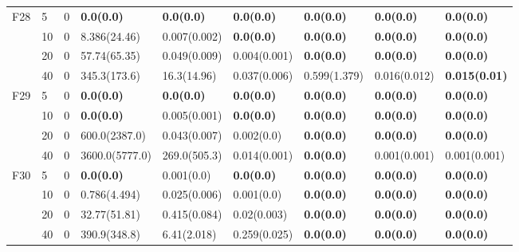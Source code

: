 \begin{longtable}{|l|l|l|l|l|l|l|l|l|}
F28            & 5   & 0        & \textbf{0.0(0.0)}             & \textbf{0.0(0.0)}           & \textbf{0.0(0.0)}       & \textbf{0.0(0.0)}         & \textbf{0.0(0.0)}      & \textbf{0.0(0.0)}     \\
\cmidrule{2-9} & 10  & 0        & 8.386(24.46)                  & 0.007(0.002)                & \textbf{0.0(0.0)}       & \textbf{0.0(0.0)}         & \textbf{0.0(0.0)}      & \textbf{0.0(0.0)}     \\
\cmidrule{2-9} & 20  & 0        & 57.74(65.35)                  & 0.049(0.009)                & 0.004(0.001)            & \textbf{0.0(0.0)}         & \textbf{0.0(0.0)}      & \textbf{0.0(0.0)}     \\
\cmidrule{2-9} & 40  & 0        & 345.3(173.6)                  & 16.3(14.96)                 & 0.037(0.006)            & 0.599(1.379)              & 0.016(0.012)           & \textbf{0.015(0.01)}  \\ \hline
F29            & 5   & 0        & \textbf{0.0(0.0)}             & \textbf{0.0(0.0)}           & \textbf{0.0(0.0)}       & \textbf{0.0(0.0)}         & \textbf{0.0(0.0)}      & \textbf{0.0(0.0)}     \\
\cmidrule{2-9} & 10  & 0        & \textbf{0.0(0.0)}             & 0.005(0.001)                & \textbf{0.0(0.0)}       & \textbf{0.0(0.0)}         & \textbf{0.0(0.0)}      & \textbf{0.0(0.0)}     \\
\cmidrule{2-9} & 20  & 0        & 600.0(2387.0)                 & 0.043(0.007)                & 0.002(0.0)              & \textbf{0.0(0.0)}         & \textbf{0.0(0.0)}      & \textbf{0.0(0.0)}     \\
\cmidrule{2-9} & 40  & 0        & 3600.0(5777.0)                & 269.0(505.3)                & 0.014(0.001)            & \textbf{0.0(0.0)}         & 0.001(0.001)           & 0.001(0.001)          \\ \hline
F30            & 5   & 0        & \textbf{0.0(0.0)}             & 0.001(0.0)                  & \textbf{0.0(0.0)}       & \textbf{0.0(0.0)}         & \textbf{0.0(0.0)}      & \textbf{0.0(0.0)}     \\
\cmidrule{2-9} & 10  & 0        & 0.786(4.494)                  & 0.025(0.006)                & 0.001(0.0)              & \textbf{0.0(0.0)}         & \textbf{0.0(0.0)}      & \textbf{0.0(0.0)}     \\
\cmidrule{2-9} & 20  & 0        & 32.77(51.81)                  & 0.415(0.084)                & 0.02(0.003)             & \textbf{0.0(0.0)}         & \textbf{0.0(0.0)}      & \textbf{0.0(0.0)}     \\
\cmidrule{2-9} & 40  & 0        & 390.9(348.8)                  & 6.41(2.018)                 & 0.259(0.025)            & \textbf{0.0(0.0)}         & \textbf{0.0(0.0)}      & \textbf{0.0(0.0)}
\label{tab:compareall table}
\end{longtable}